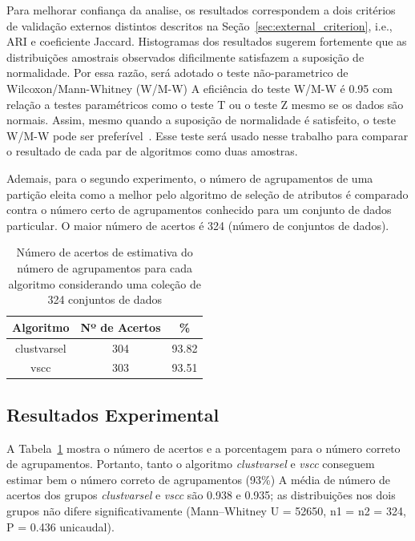 \documentclass{acm_proc_article-sp}
\begin{document}
Para melhorar confiança da analise, os resultados correspondem a dois critérios de validação externos distintos descritos na Seção~\ref{sec:external_criterion}, i.e., ARI e coeficiente Jaccard.
Histogramas dos resultados sugerem fortemente que as distribuições amostrais observados dificilmente satisfazem a suposição de normalidade.
Por essa razão, será adotado o teste não-parametrico de Wilcoxon/Mann-Whitney (W/M-W)
A eficiência do teste W/M-W é 0.95 com relação a testes paramétricos como o teste T ou o teste Z mesmo se os dados são normais.
Assim, mesmo quando a suposição de normalidade é satisfeito, o teste W/M-W pode ser preferível~\cite{triola2006elementary}.
Esse teste será usado nesse trabalho para comparar o resultado de cada par de algoritmos como duas amostras.

Ademais, para o segundo experimento, o número de agrupamentos de uma partição eleita como a melhor pelo algoritmo de seleção de atributos é comparado contra o número certo de agrupamentos conhecido para um conjunto de dados particular.
O maior número de acertos é 324 (número de conjuntos de dados).

\begin{table}
    \centering
    \begin{tabular}{ccc}
        \toprule
        Algoritmo & Nº de Acertos & \% \\
        \midrule
        clustvarsel & 304 & 93.82 \\
        vscc        & 303 & 93.51 \\
        \bottomrule
    \end{tabular}
    \caption{Número de acertos de estimativa do número de agrupamentos para cada algoritmo considerando uma coleção de 324 conjuntos de dados\protect\footnotemark}
    \label{tab:hits}
\end{table}

\subsection{Resultados Experimental}
\label{sec:results}

A Tabela~\ref{tab:hits} mostra o número de acertos e a porcentagem para o número correto de agrupamentos.
Portanto, tanto o algoritmo \textit{clustvarsel} e \textit{vscc} conseguem estimar bem o número correto de agrupamentos (93\%)
A média de número de acertos dos grupos \textit{clustvarsel} e \textit{vscc} são 0.938 e 0.935; as distribuições nos dois grupos não difere significativamente (Mann–Whitney U = 52650, n1 = n2 = 324, P = 0.436 unicaudal).
\end{document}
